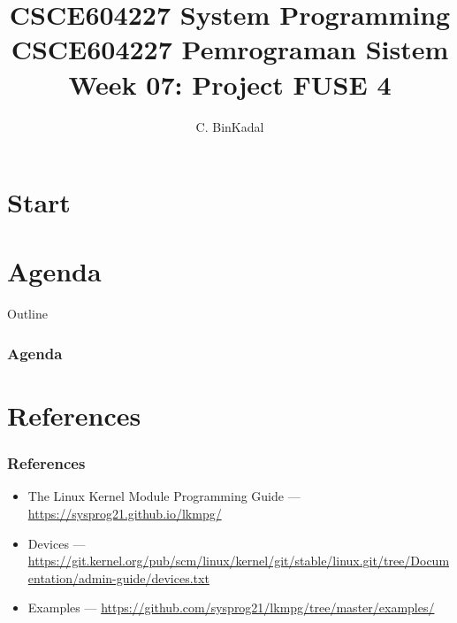 \documentclass[aspectratio=169, xcolor=table, notheorems, hyperref={pdfpagelabels=false}]{beamer}
\title[\kopikopi]
{CSCE604227 System Programming \\
CSCE604227 Pemrograman Sistem \\
Week 07:
Project FUSE 4}
\author{C. BinKadal}
\institute[SDN]
{
Sendirian Berhad\\
\medskip
\url{https://docOS.vlsm.org/SPSlides/sp07.pdf}
\\ \texttt{Always check for the latest revision!}
}
\date{\revision}
\begin{document}
\lstset{
basicstyle=\ttfamily\tiny, %
breakatwhitespace=true,
language=C,
columns=fullflexible,
keepspaces=true,
breaklines=true,
tabsize=3, 
showstringspaces=false,
extendedchars=true}

\section{Start}
\begin{frame}
\titlepage
\end{frame}




\section{Agenda}
\begin{frame}{Outline}
  \frametitle{Agenda}
  \tableofcontents[sections={1-}]
\end{frame}

\section{References}
\begin{frame}[fragile]
\frametitle{References}
\begin{itemize}
\item The Linux Kernel Module Programming Guide --- \url{https://sysprog21.github.io/lkmpg/}
\item Devices ---
      \url{https://git.kernel.org/pub/scm/linux/kernel/git/stable/linux.git/tree/Documentation/admin-guide/devices.txt}
\item Examples ---
      \url{https://github.com/sysprog21/lkmpg/tree/master/examples/}
\end{itemize}
\end{frame}
\end{document}
